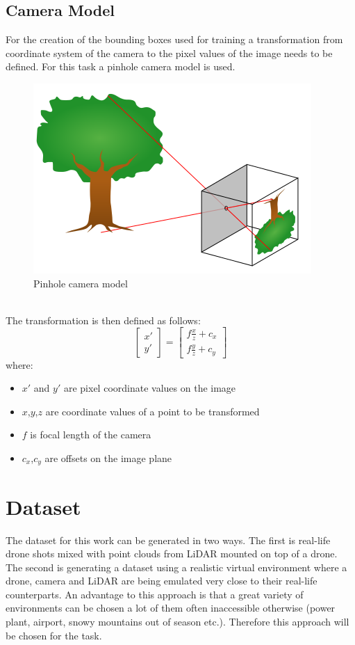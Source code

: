 \documentclass[twoside]{ctuthesis}
\theoremstyle{plain}
\theoremstyle{definition}
\theoremstyle{note}
\begin{document}
\section{Camera Model}
For the creation of the bounding boxes used for training a transformation from coordinate system of the camera to the pixel values of the image needs to be defined. For this task a pinhole camera model is used.
\begin{figure}[h]
	\centering
	\includegraphics[width=\textwidth]{pinhole.png}
	\caption{Pinhole camera model}
\end{figure}\\
The transformation is then defined as follows:
\begin{equation}
	\begin{bmatrix}
		x'\\
		y'
	\end{bmatrix}=
	\begin{bmatrix}
		f\frac{x}{z}+c_x\\
		f\frac{y}{z}+c_y
	\end{bmatrix}
\end{equation}
where:
\begin{itemize}
	\item $x'$ and $y'$ are pixel coordinate values on the image
	\item $x$,$y$,$z$ are coordinate values of a point to be transformed
	\item $f$ is focal length of the camera
	\item $c_x$,$c_y$ are offsets on the image plane
\end{itemize}
\chapter{Dataset}
The dataset for this work can be generated in two ways. The first is real-life drone shots mixed with point clouds from LiDAR mounted on top of a drone. The second is generating a dataset using a realistic virtual environment where a drone, camera and LiDAR are being emulated very close to their real-life counterparts. An advantage to this approach is that a great variety of environments can be chosen a lot of them often inaccessible otherwise (power plant, airport, snowy mountains out of season etc.). Therefore this approach will be chosen for the task.
\end{document}
